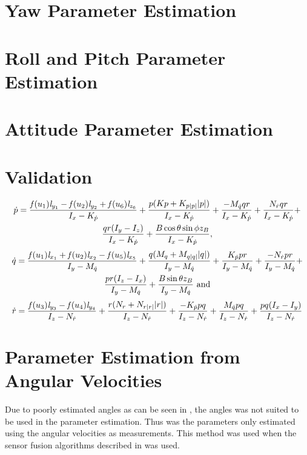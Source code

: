 \section{Yaw Parameter Estimation}

\section{Roll and Pitch Parameter Estimation}

\section{Attitude Parameter Estimation}

\section{Validation}

\begin{multline} \label{eq:p_dotWithoutTranslation}
\dot{p} = \frac{\mathit{f}(u_{1}) \mathit{l}_{y_{1}} - \mathit{f}(u_{2}) \mathit{l}_{y_{2}} + \mathit{f}(u_{6}) \mathit{l}_{z_{6}}}{I_{x} - K_{\dot{p}}} + \frac{p (Kp + K_{p|p|} |p|)}{I_{x} - K_{\dot{p}}} + \frac{-M_{\dot{q}} q r}{I_{x} - K_{\dot{p}}} + \frac{N_{\dot{r}} q r}{I_{x} - K_{\dot{p}}} +\\
\frac{q r (I_{y} - I_{z})}{I_{x} - K_{\dot{p}}} + \frac{B \cos{\theta} \sin{\phi} z_B}{I_{x} - K_{\dot{p}}},
\end{multline} 
\begin{multline} \label{eq:q_dotWithoutTranslation}
\dot{q} =\frac{\mathit{f}(u_{1}) \mathit{l}_{x_{1}} + \mathit{f}(u_{2}) \mathit{l}_{x_{2}} - \mathit{f}(u_{5}) \mathit{l}_{x_{5}}}{I_{y} - M_{\dot{q}}} + \frac{q (M_{q} + M_{q|q|} |q|)}{I_{y} - M_{\dot{q}}} + \frac{K_{\dot{p}} p r}{I_{y} - M_{\dot{q}}} + \frac{-N_{\dot{r}} p r}{I_{y} - M_{\dot{q}}} +\\
\frac{p r (I_{z} - I_{x})}{I_{y} - M_{\dot{q}}} + \frac{B \sin{\theta} z_B}{I_{y} - M_{\dot{q}}}\ \textrm{and}
\end{multline} 
\begin{multline} \label{eq:r_dotWithoutTranslation}
\dot{r} = \frac{\mathit{f}(u_{3}) \mathit{l}_{y_{3}} - \mathit{f}(u_{4}) \mathit{l}_{y_{4}}}{I_{z} - N_{\dot{r}}} + \frac{r (N_{r} + N_{r|r|} |r|)}{I_{z} - N_{\dot{r}}} + \frac{-K_{\dot{p}} p q}{I_{z} - N_{\dot{r}}} + \frac{M_{\dot{q}} p q}{I_{z} - N_{\dot{r}}} + \frac{p q (I_{x} - I_{y})}{I_{z} - N_{\dot{r}}}
\end{multline} 

\section{Parameter Estimation from Angular Velocities}
Due to poorly estimated angles as can be seen in , the angles was not suited to be used in the parameter estimation. Thus was the parameters only estimated using the angular velocities as measurements. This method was used when the sensor fusion algorithms described in  was used.

